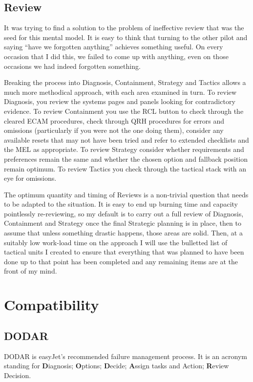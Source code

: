 \documentclass[a5paper,11pt,titlepage]{article}
\begin{document}
\subsection{Review}

It was trying to find a solution to the problem of ineffective review
that was the seed for this mental model. It is easy to think that
turning to the other pilot and saying ``have we forgotten anything''
achieves something useful. On every occasion that I did this, we failed
to come up with anything, even on those occasions we had indeed
forgotten something.

Breaking the process into Diagnosis, Containment, Strategy and Tactics
allows a much more methodical approach, with each area examined in turn.
To review Diagnosis, you review the systems pages and panels looking for
contradictory evidence. To review Containment you use the RCL button to
check through the cleared ECAM procedures, check through QRH procedures
for errors and omissions (particularly if you were not the one doing
them), consider any available resets that may not have been tried and
refer to extended checklists and the MEL as appropriate. To review
Strategy consider whether requirements and preferences remain the same
and whether the chosen option and fallback position remain optimum. To
review Tactics you check through the tactical stack with an eye for
omissions.

The optimum quantity and timing of Reviews is a non-trivial question
that needs to be adapted to the situation. It is easy to end up burning
time and capacity pointlessly re-reviewing, so my default is to carry
out a full review of Diagnosis, Containment and Strategy once the final
Strategic planning is in place, then to assume that unless something
drastic happens, those areas are solid. Then, at a suitably low
work-load time on the approach I will use the bulletted list of tactical
units I created to ensure that everything that was planned to have been
done up to that point has been completed and any remaining items are at
the front of my mind.

\section{Compatibility}
\subsection{DODAR}

DODAR is easyJet's recommended failure management process. It is an
acronym standing for \textbf{D}iagnosis; \textbf{O}ptions;
\textbf{D}ecide; \textbf{A}ssign tasks and Action; \textbf{R}eview
Decision.
\end{document}
